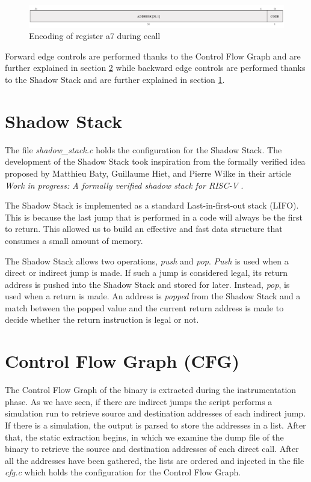\begin{figure}[htbp]
  \centering
  \includegraphics[width=.9\linewidth]{images/ecall_code.png}
  \caption{Encoding of register a7 during ecall}
  \label{fig:ecall}
\end{figure}

Forward edge controls are performed thanks to the Control Flow Graph and are further
explained in section \ref{sec:project_cfg} while backward edge controls are performed
thanks to the Shadow Stack and are further explained in section \ref{sec:project_ss}.

\section{Shadow Stack}
\label{sec:project_ss}

The file \textit{shadow\_stack.c} holds the configuration for the Shadow Stack.
The development of the Shadow Stack took inspiration from the formally verified
idea proposed by Matthieu Baty, Guillaume Hiet, and Pierre Wilke in their
article \textit{Work in progress: A formally verified shadow stack for RISC-V} \cite{shadowstack}.

The Shadow Stack is implemented as a standard Last-in-first-out stack (LIFO).
This is because the last jump that is performed in a code will always be the
first to return. This allowed us to build an effective and fast data structure that
consumes a small amount of memory.

The Shadow Stack allows two operations, \textit{push} and \textit{pop}. \textit{Push}
is used when a direct or indirect jump is made. If such a jump is considered legal,
its return address is pushed into the Shadow Stack and stored for later. Instead,
\textit{pop}, is used when a return is made. An address is \textit{popped} from
the Shadow Stack and a match between the popped value and the current return
address is made to decide whether the return instruction is legal or not.

\section{Control Flow Graph (CFG)}
\label{sec:project_cfg}

The Control Flow Graph of the binary is extracted during the instrumentation phase.
As we have seen, if there are indirect jumps the script performs a simulation run
to retrieve source and destination addresses of each indirect jump. If there is
a simulation, the output is parsed to store the addresses in a list. After that,
the static extraction begins, in which we examine the dump file of the binary to
retrieve the source and destination addresses of each direct call. After all the
addresses have been gathered, the lists are ordered and injected in the file
\textit{cfg.c} which holds the configuration for the Control Flow Graph.

